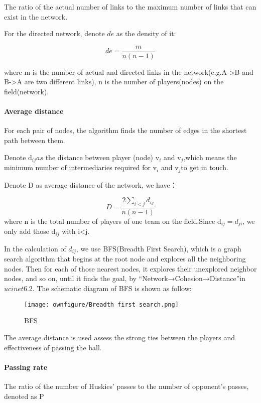 \documentclass{mcmthesis}
\begin{document}
\noindent The ratio of the actual number of links to the maximum number of links
that can exist in the network.

\noindent For the directed network, denote $de$ as the density of it:

\[
de=\frac{m}{n(n-1)}
\]

\noindent where m is the number of actual and directed links in the network(e.g.A->B
and B->A are two different links), n is the number of players(nodes)
on the field(network).

\paragraph{\textbf{Average distance}}
\noindent For each pair of nodes, the algorithm finds the number of edges in
the shortest path between them.

Denote d$_{ij}as$ the distance between player (node) v$_{i}$ and
v$_{j}$,which means the minimum number of intermediaries required
for v$_{i}$ and v$_{j}$to get in touch.

Denote D as average distance of the network, we have：

\[
D=\frac{2\sum_{i<j}d_{ij}}{n(n-1)}
\]
where n is the total number of players of one team on the field.Since
d$_{ij}=d_{ji}$, we only add those d$_{ij}$ with i<j.

In the calculation of $d_{ij}$, we use BFS(Breadth First Search),
which is a graph search algorithm that begins at the root node and
explores all the neighboring nodes. Then for each of those nearest
nodes, it explores their unexplored neighbor nodes, and so on, until
it finds the goal, by ``Network→Cohesion→Distance''in $ucinet6.2$.
The schematic diagram of BFS is shown as follow:

\begin{figure}[h]
  \centering
  \texttt{[image: ownfigure/Breadth first search.png]}
  \caption{BFS}
\end{figure}

The average distance is used assess the strong ties between the players
and effectiveness of passing the ball.

\paragraph{\textbf{Passing rate}}

\noindent The ratio of the number of Huskies' passes to the number of opponent's
passes, denoted as P
\end{document}
